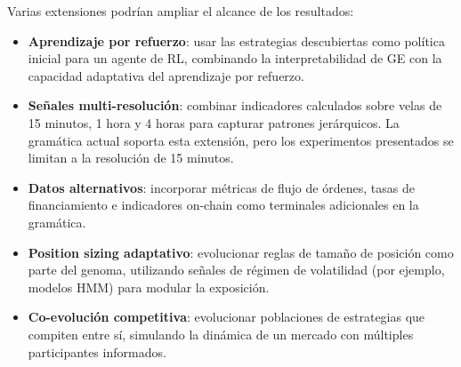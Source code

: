 \documentclass[12pt,a4paper]{article}
\begin{document}
Varias extensiones podrían ampliar el alcance de los resultados:

\begin{itemize}
\item \textbf{Aprendizaje por refuerzo}: usar las estrategias descubiertas como
  política inicial para un agente de RL, combinando la interpretabilidad de GE con
  la capacidad adaptativa del aprendizaje por refuerzo.

\item \textbf{Señales multi-resolución}: combinar indicadores calculados sobre velas
  de 15 minutos, 1 hora y 4 horas para capturar patrones jerárquicos. La gramática
  actual soporta esta extensión, pero los experimentos presentados se limitan a la
  resolución de 15 minutos.

\item \textbf{Datos alternativos}: incorporar métricas de flujo de órdenes, tasas de
  financiamiento e indicadores on-chain como terminales adicionales en la gramática.

\item \textbf{Position sizing adaptativo}: evolucionar reglas de tamaño de posición
  como parte del genoma, utilizando señales de régimen de volatilidad (por ejemplo,
  modelos HMM) para modular la exposición.

\item \textbf{Co-evolución competitiva}: evolucionar poblaciones de estrategias que
  compiten entre sí, simulando la dinámica de un mercado con múltiples participantes
  informados.
\end{itemize}
\end{document}
